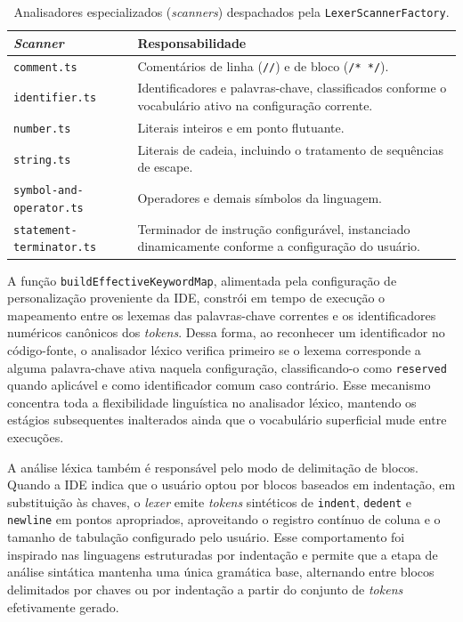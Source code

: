 \begin{table}[H]
    \centering
    \caption{Analisadores especializados (\textit{scanners}) despachados pela \texttt{LexerScannerFactory}.}
    \label{tab:scanners}
    \begin{tabular}{|l|p{9.2cm}|}
        \hline
        \textbf{\textit{Scanner}} & \textbf{Responsabilidade} \\
        \hline
        \texttt{comment.ts} & Comentários de linha (\texttt{//}) e de bloco (\texttt{/* */}). \\
        \hline
        \texttt{identifier.ts} & Identificadores e palavras-chave, classificados conforme o vocabulário ativo na configuração corrente. \\
        \hline
        \texttt{number.ts} & Literais inteiros e em ponto flutuante. \\
        \hline
        \texttt{string.ts} & Literais de cadeia, incluindo o tratamento de sequências de escape. \\
        \hline
        \texttt{symbol-and-operator.ts} & Operadores e demais símbolos da linguagem. \\
        \hline
        \texttt{statement-terminator.ts} & Terminador de instrução configurável, instanciado dinamicamente conforme a configuração do usuário. \\
        \hline
    \end{tabular}
\end{table}

A função \texttt{buildEffective}\allowbreak\texttt{KeywordMap}, alimentada pela configuração de personalização proveniente da IDE, constrói em tempo de execução o mapeamento entre os lexemas das palavras-chave correntes e os identificadores numéricos canônicos dos \textit{tokens}. Dessa forma, ao reconhecer um identificador no código-fonte, o analisador léxico verifica primeiro se o lexema corresponde a alguma palavra-chave ativa naquela configuração, classificando-o como \texttt{reserved} quando aplicável e como identificador comum caso contrário. Esse mecanismo concentra toda a flexibilidade linguística no analisador léxico, mantendo os estágios subsequentes inalterados ainda que o vocabulário superficial mude entre execuções.

A análise léxica também é responsável pelo modo de delimitação de blocos. Quando a IDE indica que o usuário optou por blocos baseados em indentação, em substituição às chaves, o \textit{lexer} emite \textit{tokens} sintéticos de \texttt{indent}, \texttt{dedent} e \texttt{newline} em pontos apropriados, aproveitando o registro contínuo de coluna e o tamanho de tabulação configurado pelo usuário. Esse comportamento foi inspirado nas linguagens estruturadas por indentação e permite que a etapa de análise sintática mantenha uma única gramática base, alternando entre blocos delimitados por chaves ou por indentação a partir do conjunto de \textit{tokens} efetivamente gerado.

